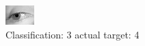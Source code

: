 \begin{figure}[h!]
\begin{center}
\includegraphics[width=0.60\columnwidth]{figures/ID2901_class_3_target_4.png}
\end{center}
\caption{ Classification: 3 actual target: 4}
\label{fig:ID2901_class_3_target_4}
\end{figure}
